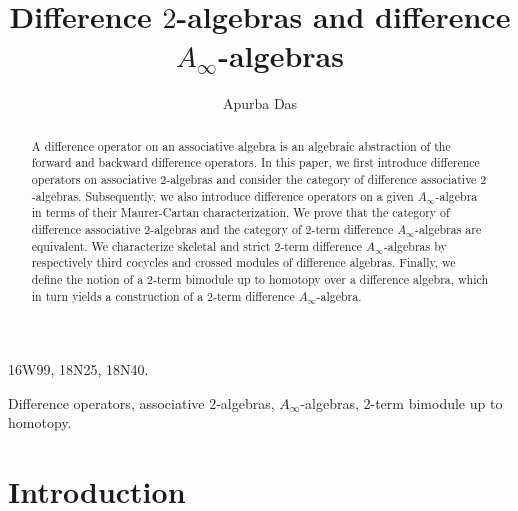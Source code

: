 \documentclass[a4paper,reqno,10pt]{amsart}
\title{}
\author{}
\date{}
\theoremstyle{plain}
\theoremstyle{definition}
\theoremstyle{remark}
\begin{document}
 
\title[]{Difference $2$-algebras and difference $A_\infty$-algebras}

\author{Apurba Das}
\address{Department of Mathematics,
Indian Institute of Technology, Kharagpur 721302, West Bengal, India.}



\begin{abstract}
A difference operator on an associative algebra is an algebraic abstraction of the forward and backward difference operators. In this paper, we first introduce difference operators on associative $2$-algebras and consider the category of difference associative $2$-algebras. Subsequently, we also introduce difference operators on a given $A_\infty$-algebra in terms of their Maurer-Cartan characterization. We prove that the category of difference associative $2$-algebras and the category of $2$-term difference $A_\infty$-algebras are equivalent. We characterize skeletal and strict $2$-term difference $A_\infty$-algebras by respectively third cocycles and crossed modules of difference algebras. Finally, we define the notion of a $2$-term bimodule up to homotopy over a difference algebra, which in turn yields a construction of a $2$-term difference $A_\infty$-algebra.
\end{abstract}

\maketitle

 16W99, 18N25, 18N40.


 Difference operators, associative $2$-algebras, $A_\infty$-algebras, $2$-term bimodule up to homotopy.


\tableofcontents

\section{Introduction}
\end{document}
